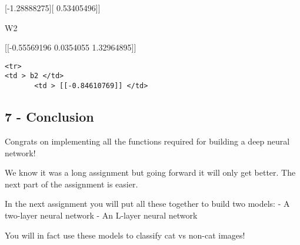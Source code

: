 \documentclass[11pt]{article}
\begin{document}
{[}-1.28888275{]}{[} 0.53405496{]}{]}

W2

{[}{[}-0.55569196 0.0354055 1.32964895{]}{]}

\begin{verbatim}
<tr>
<td > b2 </td> 
       <td > [[-0.84610769]] </td> 
\end{verbatim}

    \subsection{7 - Conclusion}\label{conclusion}

Congrats on implementing all the functions required for building a deep
neural network!

We know it was a long assignment but going forward it will only get
better. The next part of the assignment is easier.

In the next assignment you will put all these together to build two
models: - A two-layer neural network - An L-layer neural network

You will in fact use these models to classify cat vs non-cat images!


    
    
    
    
\end{document}
